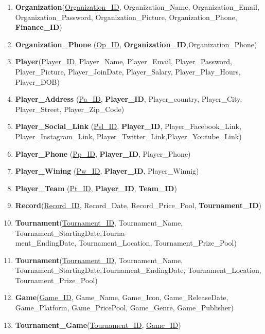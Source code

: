 \begin{enumerate}
    \item \textbf{Organization}(\underline{Organization\_ID}, Organization\_Name, Organization\_Email, Organization\_Password, Organization\_Picture, Organization\_Phone, \textbf{Finance\_ID})
    \item \textbf{Organization\_Phone} (\underline{Op\_ID}, \textbf{Organization\_ID},{Organization\_Phone})





    \item \textbf{Player}(\underline{Player\_ID}, Player\_Name, Player\_Email, Player\_Password, Player\_Picture, Player\_JoinDate, Player\_Salary, Player\_Play\_Hours, Player\_DOB)
    \item \textbf{Player\_Address} (\underline{Pa\_ID}, \textbf{Player\_ID}, Player\_country, Player\_City, Player\_Street, Player\_Zip\_Code)
    \item \textbf{Player\_Social\_Link} (\underline{Psl\_ID}, \textbf{Player\_ID}, Player\_Facebook\_Link, Player\_Instagram\_Link, Player\_Twitter\_Link,Player\_Youtube\_Link)
    \item \textbf{Player\_Phone} (\underline{Pp\_ID}, \textbf{Player\_ID}, Player\_Phone)
    \item \textbf{Player\_Wining} (\underline{Pw\_ID}, \textbf{Player\_ID}, Player\_Winnig)
    \item \textbf{Player\_Team} (\underline{Pt\_ID}, \textbf{Player\_ID}, \textbf{Team\_ID})


    \item \textbf{Record}(\underline{Record\_ID}, Record\_Date, Record\_Price\_Pool, \textbf{Tournament\_ID})
    \item \textbf{Tournament}(\underline{Tournament\_ID}, Tournament\_Name, Tournament\_StartingDate,Tourna-\\ment\_EndingDate, Tournament\_Location, Tournament\_Prize\_Pool)


    \item \textbf{Tournament}(\underline{Tournament\_ID}, Tournament\_Name, Tournament\_StartingDate,Tournament\_EndingDate, Tournament\_Location, Tournament\_Prize\_Pool)
    \item \textbf{Game}(\underline{Game\_ID}, Game\_Name, Game\_Icon, Game\_ReleaseDate, Game\_Platform, Game\_PricePool, Game\_Genre, Game\_Publisher)
    \item \textbf{Tournament\_Game}(\underline{Tournament\_ID}, \underline{Game\_ID})



\end{enumerate}
